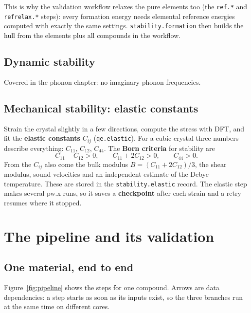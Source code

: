 \documentclass[11pt,a4paper]{report}
\newcommand{\code}[1]{\texttt{#1}}
\begin{document}
\begin{inff}
This is why the validation workflow relaxes the pure elements too (the \code{ref.*} and
\code{refrelax.*} steps): every formation energy needs elemental reference energies computed
with exactly the same settings. \code{stability.formation} then builds the hull from the
elements plus all compounds in the workflow.
\end{inff}

\section{Dynamic stability}

Covered in the phonon chapter: no imaginary phonon frequencies.

\section{Mechanical stability: elastic constants}

Strain the crystal slightly in a few directions, compute the stress with DFT, and fit the
\textbf{elastic constants} $C_{ij}$ (\code{qe.elastic}). For a cubic crystal three numbers
describe everything: $C_{11}$, $C_{12}$, $C_{44}$. The \textbf{Born criteria} for stability are
\[
  C_{11}-C_{12}>0,\qquad C_{11}+2C_{12}>0,\qquad C_{44}>0.
\]
From the $C_{ij}$ also come the bulk modulus $B=(C_{11}+2C_{12})/3$, the shear modulus, sound
velocities and an independent estimate of the Debye temperature. These are stored in the
\code{stability.elastic} record. The elastic step makes several pw.x runs, so it saves a
\textbf{checkpoint} after each strain and a retry resumes where it stopped.

\chapter{The pipeline and its validation}

\section{One material, end to end}

Figure~\ref{fig:pipeline} shows the steps for one compound. Arrows are data dependencies: a step
starts as soon as its inputs exist, so the three branches run at the same time on different
cores.
\end{document}
